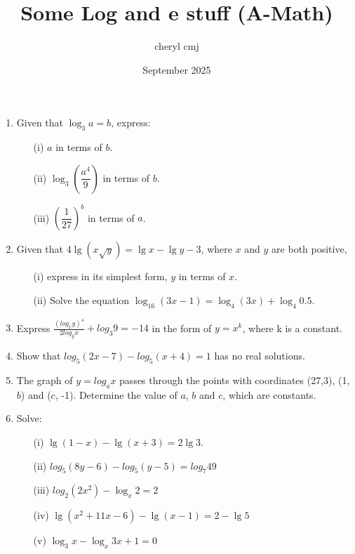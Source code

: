 \documentclass[14pt]{extarticle}
\title{Some Log and e stuff (A-Math)}
\author{cheryl cmj}
\date{September 2025}
\begin{document}
\maketitle

\begin{flushleft}
\begin{enumerate}

\textbf{Logarithms}
\vspace{0.2in}
\item Given that $\log_3 a = b$, express:
\begin{enumerate}
    \item[(i)] $a$ in terms of $b$.
    \item[(ii)] $\log_3 \left( \dfrac{a^4}{9} \right)$ in terms of $b$.
    \item[(iii)] $\left( \dfrac{1}{27} \right)^b$ in terms of $a$.
\end{enumerate}

\vspace{0.2in}
\item Given that $4 \lg \left(x \sqrt{y}\right) = \lg x - \lg y -3 $, where $x$ and $y$ are both positive, 
\begin{enumerate} 
    \item[(i)] express in its simplest form, $y$ in terms of $x$.
    \item [(ii)] Solve the equation $\log_{16}(3x - 1) = \log_{4}(3x) + \log_{4}0.5$.
\end{enumerate}
\vspace{0.2 in}

\item Express $\frac{\left(log _x y \right)^4}{2 log_y x} + log_3 9 = -14$ in the form of $y = x^k$, where k is a constant.
\vspace{0.2 in}

\item Show that $log_5\left (2x -7 \right) - log_5 \left(x+4 \right) = 1$ has no real solutions.
\vspace{0.2 in}

\item The graph of $y = log_a x$ passes through the points with coordinates (27,3), (1,$b$) and ($c$, -1). Determine the value of $a$, $b$ and $c$, which are constants.
\vspace{0.2 in}

\clearpage
\item Solve: 
    \begin{enumerate}
        \item [(i)] $\lg \left(1-x \right) - \lg\left (x+3 \right) = 2\lg3$.
        \item [(ii)] $log_5 \left(8y - 6 \right) - log_5 \left(y -5\right) = log_7 49$       
        \item[(iii)] $log_2\left(2x^2 \right) - \log_x 2 = 2$
        \item[(iv)] $\lg \left(x^2 + 11x - 6 \right) - \lg \left( x- 1\right) = 2 - \lg 5$
        \item [(v)] $\log_3 x - \log_x 3x + 1 =0$
        

\end{enumerate}
\end{enumerate}
\end{flushleft}
\end{document}
